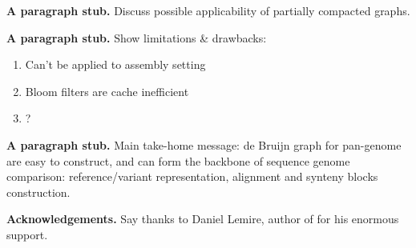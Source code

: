 \documentclass{llncs}
\newcommand{\stub}{\textbf{A paragraph stub. }}
\begin{document}
\stub Discuss possible applicability of partially compacted graphs.

\stub Show limitations \& drawbacks:
\begin{enumerate}
	\item Can't be applied to assembly setting
	\item Bloom filters are cache inefficient 
	\item ?
\end{enumerate}

\stub Main take-home message: de Bruijn graph for pan-genome are easy to construct, and can form the backbone of sequence genome comparison:
reference/variant representation, alignment and synteny blocks construction.

\textbf{Acknowledgements.} Say thanks to Daniel Lemire, author of \cite{lemire2010recursive} for his enormous support.



\end{document}
